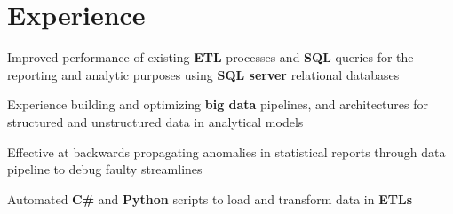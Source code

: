 \documentclass[letterpaper]{deedy-resume} %
\begin{document}
\begin{minipage}[t]{0.66\textwidth} %

\sectionspace
\section{Experience}

\vspace{11pt}

\begin{tightitemize}
\item Improved performance of existing \textbf{ETL} processes and \textbf{SQL} queries for the reporting and analytic purposes using \textbf{SQL server} relational databases

\item Experience building and optimizing \textbf{big data}  pipelines, and architectures  for structured and unstructured data in analytical models 
\item Effective at backwards propagating anomalies in statistical reports through data pipeline to debug faulty streamlines

\item Automated \textbf{C\#} and \textbf{Python} scripts to load and transform data in \textbf{ETLs} 







\end{tightitemize}
\end{minipage}
\end{document}
